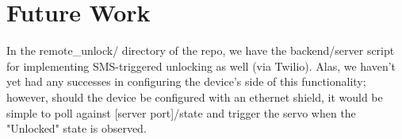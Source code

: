 \documentclass[11pt]{article}			%
\begin{document}
\section{Future Work}

In the remote\_unlock/ directory of the repo, we have the backend/server script for implementing SMS-triggered unlocking as well (via Twilio). Alas, we haven't yet had any successes in configuring the device's side of this functionality; however, should the device be configured with an ethernet shield, it would be simple to poll against [server port]/state and trigger the servo when the "Unlocked" state is observed.
\end{document}
